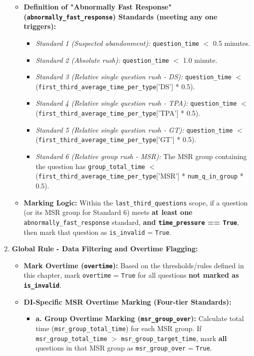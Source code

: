 \documentclass{article}
\begin{document}
\begin{enumerate}
\begin{itemize}
            \item \textbf{Definition of "Abnormally Fast Response" (\texttt{abnormally\_fast\_response}) Standards (meeting any one triggers):}
                \begin{itemize}
                    \item \textit{Standard 1 (Suspected abandonment):} \texttt{question\_time} $<$ 0.5 minutes.
                    \item \textit{Standard 2 (Absolute rush):} \texttt{question\_time} $<$ 1.0 minute.
                    \item \textit{Standard 3 (Relative single question rush - DS):} \texttt{question\_time} $<$ (\texttt{first\_third\_average\_time\_per\_type}['DS'] * 0.5).
                    \item \textit{Standard 4 (Relative single question rush - TPA):} \texttt{question\_time} $<$ (\texttt{first\_third\_average\_time\_per\_type}['TPA'] * 0.5).
                    \item \textit{Standard 5 (Relative single question rush - GT):} \texttt{question\_time} $<$ (\texttt{first\_third\_average\_time\_per\_type}['GT'] * 0.5).
                    \item \textit{Standard 6 (Relative group rush - MSR):} The MSR group containing the question has \texttt{group\_total\_time} $<$ (\texttt{first\_third\_average\_time\_per\_type}['MSR'] * \texttt{num\_q\_in\_group} * 0.5).
                \end{itemize}
            \item \textbf{Marking Logic:} Within the \texttt{last\_third\_questions} scope, if a question (or its MSR group for Standard 6) meets \textbf{at least one} \texttt{abnormally\_fast\_response} standard, \textbf{and \texttt{time\_pressure} == \texttt{True}}, then mark that question as \texttt{is\_invalid} = \texttt{True}.
        \end{itemize}
    \item \textbf{Global Rule - Data Filtering and Overtime Flagging:}
    \begin{itemize}
        \item \textbf{Mark Overtime (\texttt{overtime}):} Based on the thresholds/rules defined in this chapter, mark \texttt{overtime} = \texttt{True} for all questions \textbf{not marked as \texttt{is\_invalid}}.
        \item \textbf{DI-Specific MSR Overtime Marking (Four-tier Standards):}
            \begin{itemize}
                \item \textbf{a. Group Overtime Marking (\texttt{msr\_group\_over}):} Calculate total time (\texttt{msr\_group\_total\_time}) for each MSR group. If \texttt{msr\_group\_total\_time} $>$ \texttt{msr\_group\_target\_time}, mark \textbf{all} questions in that MSR group as \texttt{msr\_group\_over} = \texttt{True}.

\end{itemize}
\end{itemize}
\end{enumerate}
\end{document}
